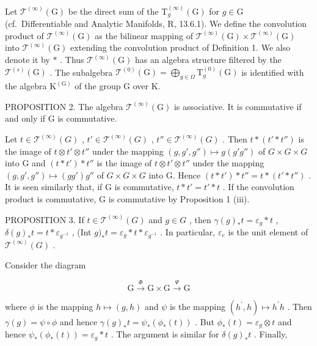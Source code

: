 Let \(\mathcal{T}^{(\infty)}(\mathrm{G})\) be the direct sum of the \(\mathrm{T}_g^{(\infty)}(\mathrm{G})\) for \(g\in \mathrm{G}\) (cf.~Differentiable and Analytic Manifolds, R, 13.6.1). We define the convolution product of \(\mathcal{T}^{(\infty)}(\mathrm{G})\) as the bilinear mapping of \(\mathcal{T}^{(\infty)}(\mathrm{G})\times \mathcal{T}^{(\infty)}(\mathrm{G})\) into \(\mathcal{T}^{(\infty)}(\mathrm{G})\) extending the convolution product of Definition 1. We also denote it by \(*\) . Thus \(\mathcal{T}^{(\infty)}(\mathrm{G})\) has an algebra structure filtered by the \(\mathcal{T}^{(s)}(\mathrm{G})\) . The subalgebra \(\mathcal{T}^{(0)}(\mathrm{G}) = \bigoplus_{g\in \Omega}\mathrm{T}_g^{(0)}(\mathrm{G})\) is identified with the algebra \(\mathrm{K}^{\mathrm{(G)}}\) of the group G over K.

PROPOSITION 2. The algebra \(\mathcal{T}^{(\infty)}(\mathrm{G})\) is associative. It is commutative if and only if \(\mathrm{G}\) is commutative.

Let \(t \in \mathcal{T}^{(\infty)}(G)\) , \(t' \in \mathcal{T}^{(\infty)}(G)\) , \(t'' \in \mathcal{T}^{(\infty)}(G)\) . Then \(t * (t' * t'')\) is the image of \(t \otimes t' \otimes t''\) under the mapping \((g, g', g'') \mapsto g(g'g'')\) of \(G \times G \times G\) into G and \((t * t') * t''\) is the image of \(t \otimes t' \otimes t''\) under the mapping \((g, g', g'') \mapsto (gg')g''\) of \(G \times G \times G\) into G. Hence \((t * t') * t'' = t * (t' * t'')\) . It is seen similarly that, if G is commutative, \(t * t' = t' * t\) . If the convolution product is commutative, G is commutative by Proposition 1 (iii).

PROPOSITION 3. If \(t \in \mathcal{T}^{(\infty)}(G)\) and \(g \in G\) , then \(\gamma(g)_*t = \varepsilon_g * t\) , \(\delta(g)_*t = t * \varepsilon_{g^{-1}}\) , (Int \(g)_*t = \varepsilon_g * t * \varepsilon_{g^{-1}}\) . In particular, \(\varepsilon_e\) is the unit element of \(\mathcal{T}^{(\infty)}(G)\) .

Consider the diagram

\[
\mathrm{G} \xrightarrow {\Phi} \mathrm{G} \times \mathrm{G} \xrightarrow {\Psi} \mathrm{G}
\]

where \(\phi\) is the mapping \(h\mapsto (g,h)\) and \(\psi\) is the mapping \((h^{\prime},h)\mapsto h^{\prime}h\) . Then \(\gamma (g) = \psi \circ \phi\) and hence \(\gamma (g)_*t = \psi_*(\phi_*(t))\) . But \(\phi_{*}(t) = \varepsilon_{g}\otimes t\) and hence \(\psi_{*}(\phi_{*}(t)) = \varepsilon_{g}*t\) . The argument is similar for \(\delta (g)_*t\) . Finally,

